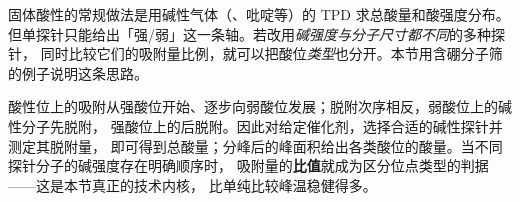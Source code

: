 \begin{probout}
固体酸性的常规做法是用碱性气体（、吡啶等）的 TPD 求总酸量和酸强度分布。
但单探针只能给出「强/弱」这一条轴。若改用\emph{碱强度与分子尺寸都不同}的多种探针，
同时比较它们的吸附量比例，就可以把酸位\emph{类型}也分开。本节用含硼分子筛的例子说明这条思路。
\end{probout}

\begin{principle}
酸性位上的吸附从强酸位开始、逐步向弱酸位发展；脱附次序相反，弱酸位上的碱性分子先脱附，
强酸位上的后脱附。因此对给定催化剂，选择合适的碱性探针并测定其脱附量，
即可得到总酸量；分峰后的峰面积给出各类酸位的酸量。当不同探针分子的碱强度存在明确顺序时，
吸附量的\textbf{比值}就成为区分位点类型的判据——这是本节真正的技术内核，
比单纯比较峰温稳健得多。
\end{principle}

